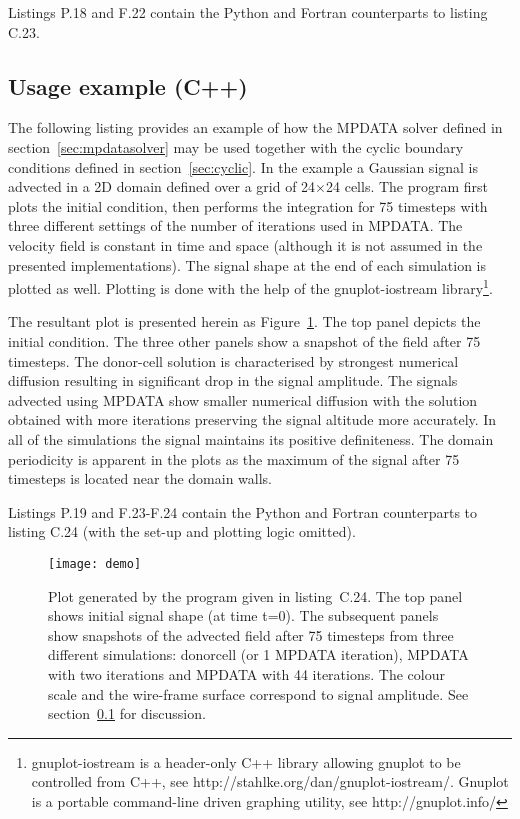 \documentclass[review,peprint,10pt,5p,times]{elsarticle}
\newcounter{lstnocpp}
\newcounter{linenocpp}
\newcommand*\FancyVerbStartString{}
\newcommand*\FancyVerbStopString{}
\newcommand{\codecpp}[4]{%
  \addtocounter{lstnocpp}{1}%
  \renewcommand*\FancyVerbStartString{\PY{c+c1}{//#2}}%
  \renewcommand*\FancyVerbStopString{\PY{c+c1}{//#3}}%
  \setcounter{FancyVerbLine}{\thelinenocpp}%
  \fvset{label={listing~C.\thelstnocpp~(C++)},rulecolor=\color{black},stepnumber=#4}%
  \setcounter{linenocpp}{\value{FancyVerbLine}}%
}
\newcommand{\url}[1]{{#1}}
\begin{document}
  Listings P.18 and F.22 contain the Python and Fortran counterparts to listing C.23.
 
  \subsection{Usage example (C++)}\label{sec:example}

  The following listing provides an example of how the MPDATA solver
    defined in section~\ref{sec:mpdatasolver} may be used together
    with the cyclic boundary conditions defined in section~\ref{sec:cyclic}.
  In the example a Gaussian signal is advected in a 2D domain 
    defined over a grid of 24$\times$24 cells.
  The program first plots the initial condition, then performs
    the integration for 75 timesteps with three different 
    settings of the number of iterations used in MPDATA.
  The velocity field is constant in time and space (although it is
    not assumed in the presented implementations).
  The signal shape at the end of each simulation is plotted as well.
  Plotting is done with the help of the gnuplot-iostream library\footnote{gnuplot-iostream
    is a header-only C++ library allowing gnuplot to be controlled from C++, see \url{http://stahlke.org/dan/gnuplot-iostream/}. 
    Gnuplot is a portable command-line driven graphing utility, see \url{http://gnuplot.info/}}.

  The resultant plot is presented herein as Figure~\ref{fig:mpdata}.
  The top panel depicts the initial condition. 
  The three other panels show a snapshot of the field after 75 timesteps.
  The donor-cell solution is characterised by strongest numerical diffusion
    resulting in significant drop in the signal amplitude.
  The signals advected using MPDATA show smaller numerical diffusion with
    the solution obtained with more iterations preserving the signal altitude 
    more accurately.
  In all of the simulations the signal maintains its positive definiteness.
  The domain periodicity is apparent in the plots as the maximum of the signal 
    after 75 timesteps is located near the domain walls.

  Listings P.19 and F.23-F.24 contain the Python and Fortran 
    counterparts to listing C.24 (with the set-up and plotting logic omitted).

  \codecpp{code-cpp-plot.cpp}{listing20}{listing21}{1}

  \begin{figure}
    \texttt{[image: demo]}
    \caption{\label{fig:mpdata}
      Plot generated by the program given in listing~C.24.
      The top panel shows initial signal shape (at time t=0).
      The subsequent panels show snapshots of the advected field after 75 timesteps
        from three different simulations: donorcell (or 1 MPDATA iteration), MPDATA
        with two iterations and MPDATA with 44 iterations.
      The colour scale and the wire-frame surface correspond to signal amplitude.
      See section~\ref{sec:example} for discussion.
    }
  \end{figure}
\end{document}
